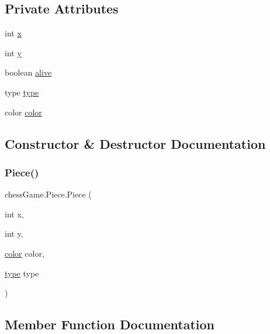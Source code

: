 \subsection*{Private Attributes}
\begin{DoxyCompactItemize}
\item 
int \hyperlink{classchess_game_1_1_piece_aeb2d3374492005d799aa6b7b85be40e7}{x}
\item 
int \hyperlink{classchess_game_1_1_piece_a56e4d8d18eca3fd03a6bd5d6112d6359}{y}
\item 
boolean \hyperlink{classchess_game_1_1_piece_a887a90577f888865d9ec706397415026}{alive}
\item 
type \hyperlink{classchess_game_1_1_piece_a1370c7f61581a1b72fa8ac2fd1af70a2}{type}
\item 
color \hyperlink{classchess_game_1_1_piece_ad5117cbbbaebf3a27c4f3c2bcbd6678b}{color}
\end{DoxyCompactItemize}


\subsection{Constructor \& Destructor Documentation}
\hypertarget{classchess_game_1_1_piece_ae619cd0f65a29cc3bd4c05cd0810f189}{}\label{classchess_game_1_1_piece_ae619cd0f65a29cc3bd4c05cd0810f189} 
\subsubsection{\texorpdfstring{Piece()}{Piece()}}
{\footnotesize\ttfamily chess\+Game.\+Piece.\+Piece (\begin{DoxyParamCaption}\item[{int}]{x,  }\item[{int}]{y,  }\item[{\hyperlink{classchess_game_1_1_piece_ad5117cbbbaebf3a27c4f3c2bcbd6678b}{color}}]{color,  }\item[{\hyperlink{classchess_game_1_1_piece_a1370c7f61581a1b72fa8ac2fd1af70a2}{type}}]{type }\end{DoxyParamCaption})}



\subsection{Member Function Documentation}
\hypertarget{classchess_game_1_1_piece_ae4e70dd293be0d4fc4fb6b8e2e8f471f}{}\label{classchess_game_1_1_piece_ae4e70dd293be0d4fc4fb6b8e2e8f471f} 
